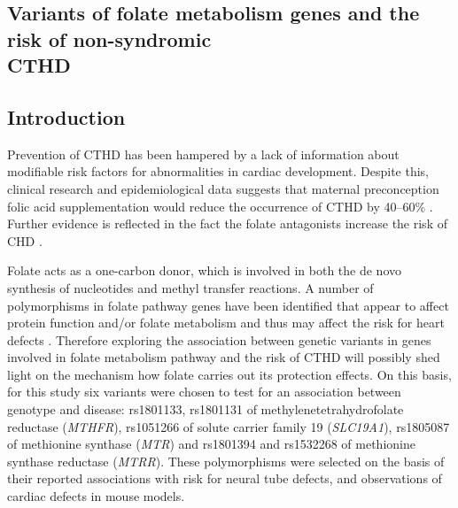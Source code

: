 \begin{refsection}

\chapter{Variants of folate metabolism genes and the risk of non-syndromic \\ CTHD} %

\label{Chapter6} %


\section{Introduction}

Prevention of CTHD has been hampered by a lack of information about modifiable risk factors for abnormalities in cardiac development. Despite this, clinical research and epidemiological data suggests that maternal preconception folic acid supplementation would reduce the occurrence of CTHD by 40–60\% \cite{smedts2008maternal,rosenquist1996homocysteine,botto2003multivitamin,boot2004cardiac}. Further evidence is reflected in the fact the folate antagonists increase the risk of CHD \cite{bailey2005folic}. 

Folate acts as a one-carbon donor, which is involved in both the de novo synthesis of nucleotides and methyl transfer reactions. A number of polymorphisms in folate pathway genes have been identified that appear to affect protein function and/or folate metabolism and thus may affect the risk for heart defects \cite{bailey2009folate}. Therefore exploring the association between genetic variants in genes involved in folate metabolism pathway and the risk of CTHD will possibly shed light on the mechanism how folate carries out its protection effects. On this basis, for this study six variants were chosen to test for an association between genotype and disease: rs1801133, rs1801131 of methylenetetrahydrofolate reductase (\textit{MTHFR}), rs1051266 of solute carrier family 19 (\textit{SLC19A1}), rs1805087 of methionine synthase (\textit{MTR}) and rs1801394 and rs1532268 of methionine synthase reductase (\textit{MTRR}). These polymorphisms were selected on the basis of their reported associations with risk for neural tube defects, and observations of cardiac defects in mouse models.


\end{refsection}
